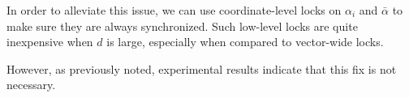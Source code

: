 \documentclass[twoside, 11pt]{article}
\begin{document}
In order to alleviate this issue, we can use coordinate-level locks on $\alpha_i$ and $\bar \alpha$ to make sure they are always synchronized.
Such low-level locks are quite inexpensive when $d$ is large, especially when compared to vector-wide locks.

However, as previously noted, experimental results indicate that this fix is not necessary.


\end{document}
